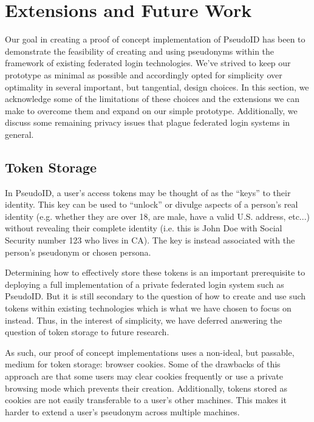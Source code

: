 \documentclass[11pt]{llncs}
\begin{document}

\section{Extensions and Future Work}
\label{sec:extns}

Our goal in creating a proof of concept implementation of PseudoID
has been to demonstrate the feasibility of creating and using
pseudonyms within the framework of existing federated login
technologies. We've strived to keep our prototype as minimal as
possible and accordingly opted for simplicity over optimality
in several important, but tangential, design choices. In this section,
we acknowledge some of the limitations of these choices and the
extensions we can make to overcome them and expand on our simple
prototype. Additionally, we discuss some remaining privacy issues that
plague federated login systems in general.

\subsection{Token Storage}

In PseudoID, a user's access tokens may be thought of as the
``keys'' to their identity. This key can be used to ``unlock''
or divulge aspects of a person's real identity (e.g. whether they
are over 18, are male, have a valid U.S. address, etc...) without
revealing their complete identity (i.e. this is John Doe with 
Social Security number 123 who lives in CA). The key is instead
associated with the person's pseudonym or chosen persona.

Determining how to effectively store these tokens
is an important prerequisite to deploying a full implementation of
a private federated login system such as PseudoID. But it is
still secondary to the question of how to create and use such
tokens within existing technologies which is what we have chosen
to focus on instead. Thus, in the interest of simplicity,
we have deferred answering the question of token storage to
future research.

As such, our proof of concept implementations uses a non-ideal,
but passable, medium for token storage: browser cookies. Some of
the drawbacks of this approach are that some users may clear cookies
frequently or use a private browsing mode which prevents their
creation. Additionally, tokens stored as cookies are not easily
transferable to a user's other machines. This makes it harder to
extend a user's pseudonym across multiple machines. 
\end{document}
